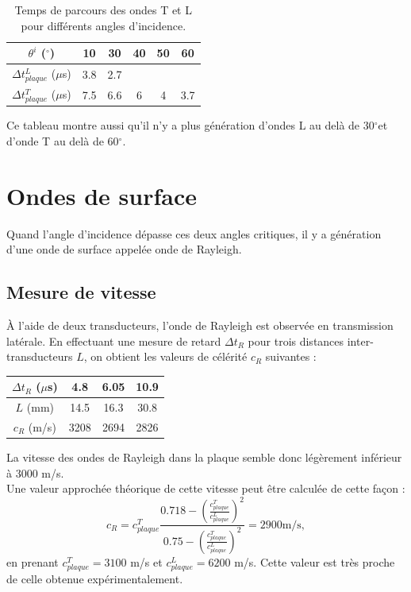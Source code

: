 \documentclass[twoside]{article}
\renewcommand{\degre}{$^{\circ}$}
\begin{document}
\begin{multicols}{2}
\begin{table}[H]
	\begin{tabular}{c|c|c|c|c|c}
		$\theta^{i}$ ($^{\circ}$)  & 10 & 30 & 40 & 50 & 60\\ \hline
		$\Delta t_{plaque}^L$ ($\mu$s)& 3.8 & 2.7 & & &   \\ \hline
		$\Delta t_{plaque}^T$ ($\mu$s) &7.5& 6.6 & 6 & 4 & 3.7\\ 
	\end{tabular}
	\caption{Temps de parcours des ondes T et L pour différents angles d'incidence.\label{tab}}
\end{table}

Ce tableau montre aussi qu'il n'y a plus génération d'ondes L au delà de 30\degre et d'onde T au delà de 60\degre.


\section{Ondes de surface}

Quand l'angle d'incidence dépasse ces deux angles critiques, il y a génération d'une onde de surface appelée onde de Rayleigh.
\subsection{Mesure de vitesse}
À l'aide de deux transducteurs, l'onde de Rayleigh est observée en transmission latérale. En effectuant une mesure de retard $\Delta t_R$ pour trois distances inter-transducteurs $L$, on obtient les valeurs de célérité $c_R$ suivantes :

\begin{tabular}{c|c| c | c}
$\Delta t_R$ ($\mu$s) &4.8 & 6.05 & 10.9 \\ \hline
$L$ (mm) & 14.5 & 16.3 & 30.8 \\ \hline
$c_R$ (m/s) &3208 & 2694 & 2826
\end{tabular}

La vitesse des ondes de Rayleigh dans la plaque semble donc légèrement inférieur à 3000 m/s.\\

Une valeur approchée théorique de cette vitesse peut être calculée de cette façon : 
$$c_R=c_{plaque}^T \frac{0.718 - \left(\frac{c_{plaque}^T}{c_{plaque}^L}\right)^2}{0.75 - \left(\frac{c_{plaque}^T}{c_{plaque}^L}\right)^2}=2900 \text{m/s},$$
en prenant $c_{plaque}^T=3100$ m/s et  $c_{plaque}^L=6200$ m/s.
Cette valeur est très proche de celle obtenue expérimentalement.


\end{multicols}
\end{document}

